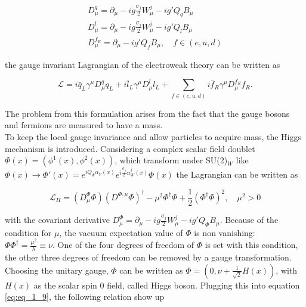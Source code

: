 \begin{equation}
	\label{eq:eq_1_7}
	\begin{split}
		D^{q}_{\mu} = \partial_{\mu}  - ig\frac{\sigma_{j}}{2}W^{j}_{\mu} - ig'Q_{q}B_{\mu} \\
		D^{l}_{\mu} = \partial_{\mu}  - ig\frac{\sigma_{j}}{2}W^{j}_{\mu} - ig'Q_{l}B_{\mu} \\
		D^{f_R}_{\mu} = \partial_{\mu}  - ig'Q_{f}B_{\mu}, \quad f \in (e, u, d)
	\end{split}
\end{equation}

the gauge invariant Lagrangian of the electroweak theory can be written as 

\begin{equation}
	\label{eq:eq_1_8}
	\mathcal{L} = i\bar{q}_{L}\gamma^{\mu}D_{\mu}^{q}q_{L} + i\bar{l}_{L}\gamma^{\mu}D_{\mu}^{l}l_{L} + \sum_{f \in (e, u, d)} i\bar{f}_{R}\gamma^{\mu}D^{f_R}_{\mu}f_{R}.
\end{equation}

The problem from this formulation arises from the fact that the gauge bosons and fermions are measured to have a mass. \\

To keep the local gauge invariance and allow particles to acquire mass, the Higgs mechanism \cite{HIGGS} is introduced. Considering a complex scalar field doublet $\Phi(x) = (\phi^{1}(x), \phi^{2}(x))$, which transform under SU(2)$_{W}$ like $\Phi(x) \rightarrow \Phi'(x) = e^{iQ_{\Phi} \alpha_{Y}(x)} e^{i\frac{\sigma_{j}}{2}\alpha^{j}_{W}(x)}\Phi(x)$ the Lagrangian can be written as

\begin{equation}
	\label{eq:eq_1_9}
	\mathcal{L}_{H} = (D^{\Phi}_{\mu}\Phi)(D^{\Phi, \mu}\Phi)^{\dagger} - \mu^2\Phi^{\dagger}\Phi + \frac{1}{2}(\Phi^{\dagger}\Phi)^2, \quad \mu^2 > 0
\end{equation}

with the covariant derivative $D^{\Phi}_{\mu} = \partial_{\mu}  - ig\frac{\sigma_{j}}{2}W^{j}_{\mu} - ig'Q_{\Phi}B_{\mu}$. Because of the condition for $\mu$, the vacuum expectation value of $\Phi$ is non vanishing: $\Phi\Phi^{\dagger} = \frac{\mu^2}{\lambda} \equiv \nu$. One of the four degrees of freedom of $\Phi$ is set with this condition, the other three degrees of freedom can be removed by a gauge transformation. Choosing the unitary gauge, $\Phi$ can be written as $\Phi = (0, \nu + \frac{1}{\sqrt{2}}H(x))$, with $H(x)$ as the scalar spin 0 field, called Higgs boson. Plugging this into equation \ref{eq:eq_1_9}, the following relation show up

